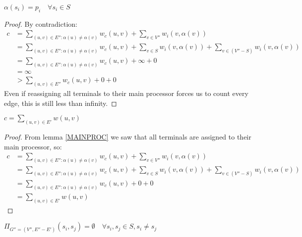 \documentclass{article}
\begin{document}
\begin{lemma}
\label{MAINPROC}
$\alpha(s_i) = p_i \quad \forall s_i \in S$
\end{lemma}
\begin{proof}
By contradiction:
\begin{align}
	\nonumber c 	& = \displaystyle\sum\limits_{(u,v) \in E'' : \alpha(u) \neq \alpha(v)} w_c(u,v) + \displaystyle\sum\limits_{v \in V''} w_i(v, \alpha(v)) \\
	\nonumber		& = \displaystyle\sum\limits_{(u,v) \in E'' : \alpha(u) \neq \alpha(v)} w_c(u,v) + \displaystyle\sum\limits_{v \in S} w_i(v, \alpha(v)) + \displaystyle\sum\limits_{v \in (V'' - S)} w_i(v, \alpha(v)) \\
	\nonumber		& = \displaystyle\sum\limits_{(u,v) \in E'' : \alpha(u) \neq \alpha(v)} w_c(u,v) + \infty + 0 \\
	\nonumber		& = \infty \\
	\nonumber		& > \displaystyle\sum\limits_{(u,v) \in E''} w_c(u,v) + 0 + 0
\end{align}
Even if reassigning all terminals to their main processor forces us to count every edge, this is still less than infinity.
\end{proof}

\begin{corollary}
\label{COSTMIN}
$c = \displaystyle\sum\limits_{(u,v) \in E'} w(u,v)$
\end{corollary}

\begin{proof}
From lemma \ref{MAINPROC} we saw that all terminals are assigned to their main processor, so:
\begin{align}
	\nonumber c 	& = \displaystyle\sum\limits_{(u,v) \in E'' : \alpha(u) \neq \alpha(v)} w_c(u,v) + \displaystyle\sum\limits_{v \in V''} w_i(v, \alpha(v)) \\
	\nonumber		& = \displaystyle\sum\limits_{(u,v) \in E'' : \alpha(u) \neq \alpha(v)} w_c(u,v) + \displaystyle\sum\limits_{v \in S} w_i(v, \alpha(v)) + \displaystyle\sum\limits_{v \in (V'' - S)} w_i(v, \alpha(v)) \\
	\nonumber		& = \displaystyle\sum\limits_{(u,v) \in E'' : \alpha(u) \neq \alpha(v)} w_c(u,v) + 0 + 0 \\
	\nonumber		& = \displaystyle\sum\limits_{(u,v) \in E'} w(u,v)
\end{align}
\end{proof}

\begin{lemma}
\label{BREAKPATH}
$\Pi_{G''=(V'', E'' - E')} (s_i, s_j) = \emptyset \quad \forall s_i, s_j \in S, s_i \neq s_j$
\end{lemma}
\end{document}

